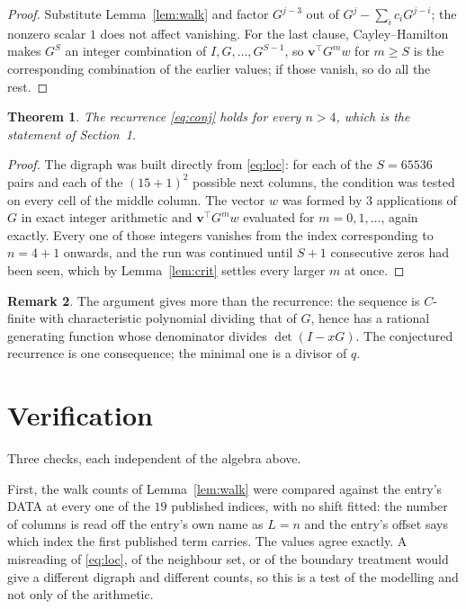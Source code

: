 \documentclass[11pt,a4paper]{article}
\theoremstyle{plain}
\newtheorem{theorem}{Theorem}
\theoremstyle{definition}
\newtheorem{remark}[theorem]{Remark}
\begin{document}
\begin{proof}
Substitute Lemma~\ref{lem:walk} and factor $G^{j-3}$ out of
$G^{j}-\sum_ic_iG^{j-i}$; the nonzero scalar $1$ does not affect
vanishing. For the last clause, Cayley--Hamilton makes $G^{S}$ an integer combination of
$I,G,\dots,G^{S-1}$, so $\mathbf{v}^{\!\top}G^{m}w$ for $m\ge S$ is the corresponding
combination of the earlier values; if those vanish, so do all the rest.
\end{proof}

\begin{theorem}
The recurrence \eqref{eq:conj} holds for every $n>4$, which is the statement of
Section~1.
\end{theorem}

\begin{proof}
The digraph was built directly from \eqref{eq:loc}: for each of the $S=65536$ pairs and each
of the $(15+1)^{2}$ possible next columns, the condition was tested on every cell of
the middle column. The vector $w$ was formed by $3$ applications of $G$ in exact integer
arithmetic and $\mathbf{v}^{\!\top}G^{m}w$ evaluated for $m=0,1,\dots$, again exactly.
Every one of those integers vanishes from the index corresponding to $n=4+1$ onwards,
and the run was continued until $S+1$ consecutive zeros had been seen, which by
Lemma~\ref{lem:crit} settles every larger $m$ at once.
\end{proof}

\begin{remark}
The argument gives more than the recurrence: the sequence is $C$-finite with characteristic
polynomial dividing that of $G$, hence has a rational generating function whose denominator
divides $\det(I-xG)$. The conjectured recurrence is one consequence; the minimal one is a
divisor of $q$.
\end{remark}

\section{Verification}

Three checks, each independent of the algebra above.

First, the walk counts of Lemma~\ref{lem:walk} were compared against the entry's DATA at
every one of the $19$ published indices, with no shift fitted: the number of columns is
read off the entry's own name as $L=n$ and the entry's offset says which index the first
published term carries. The values agree exactly. A misreading of \eqref{eq:loc}, of the
neighbour set, or of the boundary treatment would give a different digraph and different
counts, so this is a test of the modelling and not only of the arithmetic.
\end{document}
